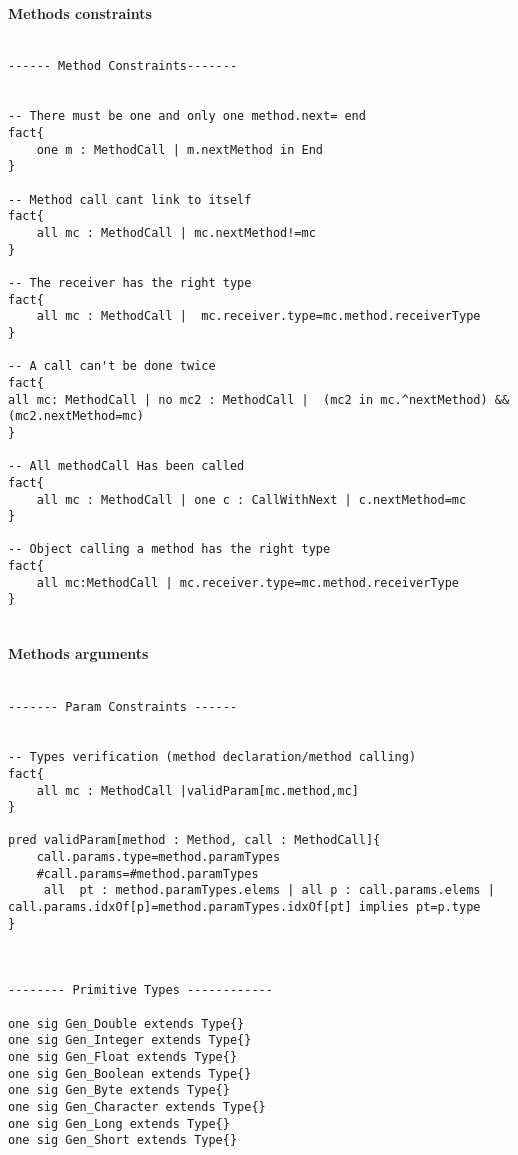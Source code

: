 \paragraph{Methods constraints}
\lstset{language=Alloy} 
\begin{lstlisting}[frame=single]

------ Method Constraints-------


-- There must be one and only one method.next= end
fact{
    one m : MethodCall | m.nextMethod in End
}

-- Method call cant link to itself 
fact{
    all mc : MethodCall | mc.nextMethod!=mc
}

-- The receiver has the right type
fact{
    all mc : MethodCall |  mc.receiver.type=mc.method.receiverType
}

-- A call can't be done twice
fact{
all mc: MethodCall | no mc2 : MethodCall |  (mc2 in mc.^nextMethod) && (mc2.nextMethod=mc)
}

-- All methodCall Has been called
fact{
    all mc : MethodCall | one c : CallWithNext | c.nextMethod=mc
}

-- Object calling a method has the right type
fact{
    all mc:MethodCall | mc.receiver.type=mc.method.receiverType
}


\end{lstlisting}
\paragraph{Methods arguments}
\lstset{language=Alloy} 
\begin{lstlisting}[frame=single]

------- Param Constraints ------


-- Types verification (method declaration/method calling)
fact{
    all mc : MethodCall |validParam[mc.method,mc]
}

pred validParam[method : Method, call : MethodCall]{
	call.params.type=method.paramTypes
	#call.params=#method.paramTypes
     all  pt : method.paramTypes.elems | all p : call.params.elems | call.params.idxOf[p]=method.paramTypes.idxOf[pt] implies pt=p.type
}



-------- Primitive Types ------------

one sig Gen_Double extends Type{}
one sig Gen_Integer extends Type{}
one sig Gen_Float extends Type{}
one sig Gen_Boolean extends Type{}
one sig Gen_Byte extends Type{}
one sig Gen_Character extends Type{}
one sig Gen_Long extends Type{}
one sig Gen_Short extends Type{}

\end{lstlisting} 



